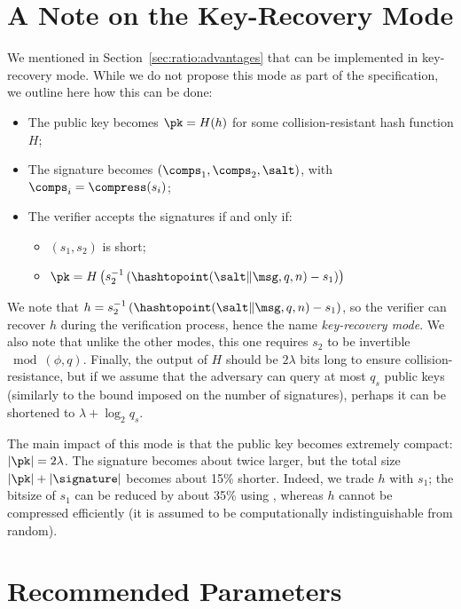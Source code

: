 \section{A Note on the Key-Recovery Mode}\label{sec:key-recovery}

We mentioned in Section~\ref{sec:ratio:advantages} that \falcon can be implemented in key-recovery mode. While we do not propose this mode as part of the specification, we outline here how this can be done:
\begin{itemize}
	\item The public key becomes $\pk = H(h)$ for some collision-resistant hash function $H$;
	\item The signature becomes $(\comps_1, \comps_2, \salt)$, with $\comps_i = \compress(s_i)$;
	\item The verifier accepts the signatures if and only if:
	\begin{itemize}[noitemsep]
		\item $(s_1, s_2)$ is short;
		\item $ \pk = H \left(s_2^{-1} \left( \hashtopoint(\salt\|\msg, q, n) - s_1 \right) \right)$
	\end{itemize}
\end{itemize}
We note that $h = s_2^{-1} \left( \hashtopoint(\salt\|\msg, q, n) - s_1 \right)$, so the verifier can recover $h$ during the verification process, hence the name \textit{key-recovery mode}.
We also note that unlike the other modes, this one requires $s_2$ to be invertible $\bmod (\phi, q)$. Finally, the output of $H$ should be $2 \lambda$ bits long to ensure collision-resistance, but if we assume that the adversary can query at most $q_s$ public keys (similarly to the bound imposed on the number of signatures), perhaps it can be shortened to $\lambda + \log_2 q_s$.

The main impact of this mode is that the public key becomes extremely compact: $|\pk| = 2 \lambda$. The signature becomes about twice larger, but the total size $|\pk| + |\signature|$ becomes about 15\% shorter. Indeed, we trade $h$ with $s_1$; the bitsize of $s_1$ can be reduced by about 35\% using \compress, whereas $h$ cannot be compressed efficiently (it is assumed to be computationally indistinguishable from random).


\section{Recommended Parameters} \label{sec:spec:params}


